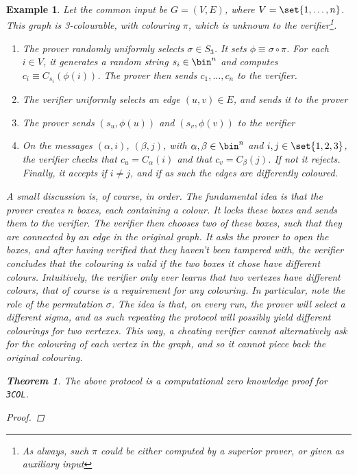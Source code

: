 \documentclass{article}
\newtheorem{theorem}{Theorem}
\newtheorem{example}{Example}
\begin{document}
\begin{example}
    Let the common input be $G = (V, E)$, where $V = \set{1, \dots, n }$.
    This graph is 3-colourable, with colouring $\pi$, which is unknown to the verifier\footnote{As always, such $\pi$ could be either computed by a superior prover, or given as auxiliary input}.
    \begin{enumerate}
        \item The prover randomly uniformly selects $\sigma \in S_3$. It sets $\phi \equiv \sigma \circ \pi$.
              For each $i \in V$, it generates a random string $s_i \in \bin^n$ and computes $c_i \equiv C_{s_i}(\phi(i))$.
              The prover then sends $c_1, \dots, c_n$ to the verifier.
        \item The verifier uniformly selects an edge $(u, v) \in E$, and sends it to the prover
        \item The prover sends $(s_u, \phi(u))$ and $(s_v, \phi(v))$ to the verifier
        \item On the messages $(\alpha, i)$, $(\beta, j)$, with $\alpha, \beta \in \bin^n$ and $i, j \in  \set{1, 2, 3}$, the verifier checks that $c_u = C_\alpha(i)$ and that
              $c_v = C_\beta(j)$. If not it rejects. Finally, it accepts if $i \neq j$, and if as such the edges are differently coloured.
    \end{enumerate}
    A small discussion is, of course, in order. The fundamental idea is that the prover creates $n$ boxes, each containing a colour.
    It locks these boxes and sends them to the verifier. The verifier then chooses two of these boxes, such that they are connected by an edge in the original graph.
    It asks the prover to open the boxes, and after having verified that they haven't been tampered with, the verifier concludes that the colouring is valid if the two boxes it chose have different colours.
    Intuitively, the verifier only ever learns that two vertexes have different colours, that of course is a requirement for any colouring.
    In particular, note the role of the permutation $\sigma$. The idea is that, on every run, the prover will select a different sigma, and as such
    repeating the protocol will possibly yield different colourings for two vertexes. This way, a cheating verifier cannot alternatively ask for the colouring
    of each vertex in the graph, and so it cannot piece back the original colouring.
    \begin{theorem}
        The above protocol is a computational zero knowledge proof for \texttt{3COL}.
    \end{theorem}
    \begin{proof}

\end{proof}
\end{example}
\end{document}
